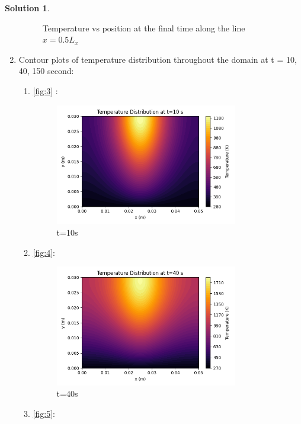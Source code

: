 \documentclass[12pt]{article}
\theoremstyle{definition} %
\newtheorem{solution}{Solution}
\theoremstyle{plain} %
\begin{document}
\begin{solution}
\begin{enumerate}
\begin{figure}[htbp]
        \caption{Temperature vs position at the final time along the line $x = 0.5L_x$}
        \label{fig:2}
    \end{figure}
    \item Contour plots of temperature distribution throughout the domain at t = 10, 40, 150
    second:
    \begin{enumerate}
        \item \autoref{fig:3} : \begin{figure}[htbp]

            \centering
            \includegraphics[width=0.8\textwidth]{classes/TAM-470/06-10/proj-2.2.4.1.png}
            \caption{t=10s}
            \label{fig:3}
        \end{figure}
        \item \autoref{fig:4}: \begin{figure}[htbp]
            \centering
            \includegraphics[width=0.8\textwidth]{classes/TAM-470/06-10/proj-2.2.4.2.png}
            \caption{t=40s}
            \label{fig:4}
        \end{figure}
    \item \autoref{fig:5}: \begin{figure}[htbp]

\end{figure}
\end{enumerate}
\end{enumerate}
\end{solution}
\end{document}
